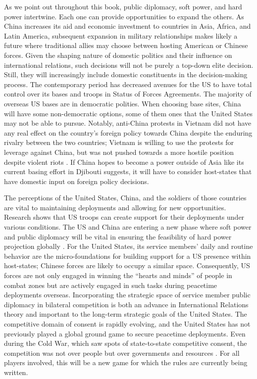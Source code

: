 As we point out throughout this book, public diplomacy, soft power, and hard power intertwine. Each one can provide opportunities to expand the others. As China increases its aid and economic investment to countries in Asia, Africa, and Latin America, subsequent expansion in military relationships makes likely a future where traditional allies may choose between hosting American or Chinese forces. Given the shaping nature of domestic politics and their influence on international relations, such decisions will not be purely a top-down elite decision. Still, they will increasingly include domestic constituents in the decision-making process. The contemporary period has decreased avenues for the US to have total control over its bases and troops in Status of Forces Agreements. The majority of overseas US bases are in democratic polities. When choosing base sites, China will have some non-democratic options, some of them ones that the United States may not be able to pursue. Notably, anti-China protests in Vietnam did not have any real effect on the country's foreign policy towards China despite the enduring rivalry between the two countries; Vietnam is willing to use the protests for leverage against China, but was not pushed towards a more hostile position despite violent riots \cite{Hoang2019}. If China hopes to become a power outside of Asia like its current basing effort in Djibouti suggests, it will have to consider host-states that have domestic input on foreign policy decisions. 

The perceptions of the United States, China, and the soldiers of those countries are vital to maintaining deployments and allowing for new opportunities. Research shows that US troops can create support for their deployments under various conditions.  The US and China are entering a new phase where soft power and public diplomacy will be vital in ensuring the feasibility of hard power projection globally \cite{Trunkos2020}. For the United States, its service members' daily and routine behavior are the micro-foundations for building support for a US presence within host-states; Chinese forces are likely to occupy a similar space. Consequently, US forces are not only engaged in winning the ``hearts and minds'' of people in combat zones but are actively engaged in such tasks during peacetime deployments overseas. Incorporating the strategic space of service member public diplomacy in bilateral competition is both an advance in International Relations theory and important to the long-term strategic goals of the United States. The competitive domain of consent is rapidly evolving, and the United States has not previously played a global ground game to secure peacetime deployments. Even during the Cold War, which saw spots of state-to-state competitive consent, the competition was not over people but over governments and resources \cite{Harkavy1982,Harkavy1989,calder2007}. For all players involved, this will be a new game for which the rules are currently being written. 





